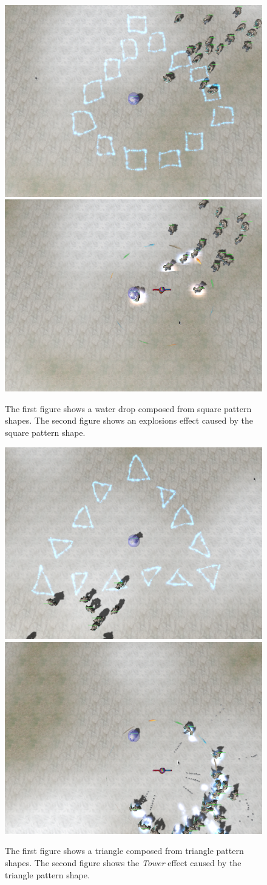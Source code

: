 \begin{figure}[p]
\centering
\includegraphics[width=.47\linewidth]{ext/scr/patsquare.png}
\quad
\includegraphics[width=.47\linewidth]{ext/scr/patsquaree.png}
\caption{The first figure shows a water drop composed from square pattern shapes. The second figure shows an explosions effect caused by the square pattern shape. }
\label{fig:spell:patsquare}
\end{figure}

\begin{figure}[p]
\centering
\includegraphics[width=.47\linewidth]{ext/scr/pattriangle.png}
\quad
\includegraphics[width=.47\linewidth]{ext/scr/pattrianglee.png}
\caption{The first figure shows a triangle composed from triangle pattern shapes. The second figure shows the \emph{Tower} effect caused by the triangle pattern shape. }
\label{fig:spell:pattriangle}
\end{figure}


